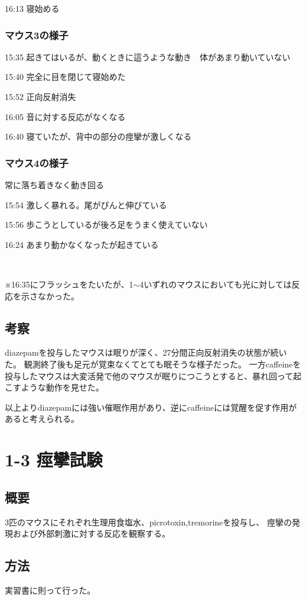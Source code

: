 \documentclass[a4paper,papersize,dvipdfmx]{jsarticle}
\begin{document}
16:13 寝始める

\subsubsection*{マウス3の様子}
15:35 起きてはいるが、動くときに這うような動き　体があまり動いていない

15:40 完全に目を閉じて寝始めた

15:52 正向反射消失

16:05 音に対する反応がなくなる

16:40 寝ていたが、背中の部分の痙攣が激しくなる

\subsubsection*{マウス4の様子}
常に落ち着きなく動き回る

15:54 激しく暴れる。尾がぴんと伸びている

15:56 歩こうとしているが後ろ足をうまく使えていない

16:24 あまり動かなくなったが起きている

\

※16:35にフラッシュをたいたが、1$\sim$4いずれのマウスにおいても光に対しては反応を示さなかった。


\subsection*{考察}
diazepamを投与したマウスは眠りが深く、27分間正向反射消失の状態が続いた。
観測終了後も足元が覚束なくてとても眠そうな様子だった。
一方caffeineを投与したマウスは大変活発で他のマウスが眠りにつこうとすると、暴れ回って起こすような動作を見せた。

以上よりdiazepamには強い催眠作用があり、逆にcaffeineには覚醒を促す作用があると考えられる。




\section*{1-3 痙攣試験}

\subsection*{概要}
3匹のマウスにそれぞれ生理用食塩水、picrotoxin,tremorineを投与し、
痙攣の発現および外部刺激に対する反応を観察する。

\subsection*{方法}
実習書に則って行った。
\end{document}
